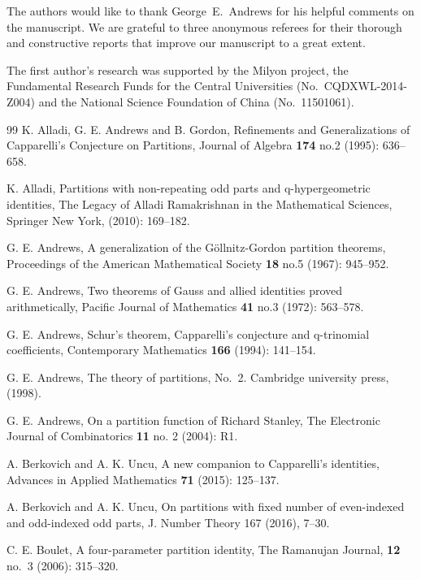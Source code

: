 \documentclass[12pt]{amsart}
\numberwithin{equation}{section}
\theoremstyle{plain}
\theoremstyle{definition}
\begin{document}
  The authors would like to thank George~E.~Andrews for his helpful comments on the manuscript. We are grateful to 
   three anonymous referees for their thorough and constructive reports that improve our manuscript to a great extent.

The first author's research was supported by the Milyon project, the Fundamental Research Funds for the Central Universities (No.~CQDXWL-2014-Z004) and the National Science Foundation of China (No.~11501061).

\small

\begin{thebibliography}{99}
 K. Alladi, G. E. Andrews and B. Gordon, Refinements and Generalizations of Capparelli's Conjecture on Partitions, Journal of Algebra {\bf 174} no.2 (1995): 636--658.

 K. Alladi, Partitions with non-repeating odd parts and q-hypergeometric identities, The Legacy of Alladi Ramakrishnan in the Mathematical Sciences, Springer New York, (2010): 169--182.

 G. E. Andrews, A generalization of the G\"{o}llnitz-Gordon partition theorems, Proceedings of the American Mathematical Society {\bf 18} no.5 (1967): 945--952.

 G. E. Andrews, Two theorems of Gauss and allied identities proved arithmetically, Pacific Journal of Mathematics {\bf 41} no.3 (1972): 563--578.

 G. E. Andrews, Schur's theorem, Capparelli's conjecture and q-trinomial coefficients, Contemporary Mathematics {\bf 166} (1994): 141--154.

 G. E. Andrews, The theory of partitions, No.~2. Cambridge university press, (1998).

 G. E. Andrews, On a partition function of Richard Stanley, The Electronic Journal of Combinatorics {\bf 11} no. 2 (2004): R1.







 A. Berkovich and A. K. Uncu, A new companion to Capparelli's identities, Advances in Applied Mathematics {\bf 71} (2015): 125--137.

 A. Berkovich and A. K. Uncu, On partitions with fixed number of even-indexed and odd-indexed odd parts, J. Number Theory 167 (2016), 7--30.


 C. E. Boulet, A four-parameter partition identity, 
The Ramanujan Journal, {\bf12} no.~3 (2006): 315--320.


\end{thebibliography}
\end{document}
